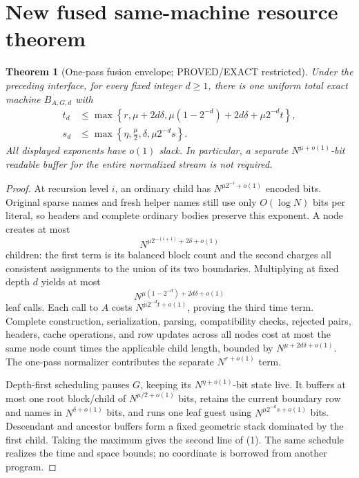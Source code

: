 \documentclass[11pt]{article}
\newtheorem{theorem}{Theorem}
\begin{document}
\section{New fused same-machine resource theorem}
\begin{theorem}[One-pass fusion envelope; PROVED/EXACT restricted]
Under the preceding interface, for every fixed integer \(d\ge1\), there is
one uniform total exact machine \(B_{A,G,d}\) with
\[
\boxed{\begin{aligned}
t_d&\le\max\left\{r,
 \mu+2d\delta,
 \mu(1-2^{-d})+2d\delta+\mu 2^{-d}t\right\},\\
s_d&\le\max\left\{\eta,
 \frac\mu2,\delta,\mu 2^{-d}s\right\}.
\end{aligned}}
\tag{1}
\]
All displayed exponents have \(o(1)\) slack.  In particular, a separate
\(N^{\mu+o(1)}\)-bit readable buffer for the entire normalized stream is not
required.
\end{theorem}
\begin{proof}
At recursion level \(i\), an ordinary child has
\(N^{\mu 2^{-i}+o(1)}\) encoded bits.  Original sparse names and fresh helper
names still use only \(O(\log N)\) bits per literal, so headers and complete
ordinary bodies preserve this exponent.  A node creates at most
\[
N^{\mu2^{-(i+1)}+2\delta+o(1)}
\]
children: the first term is its balanced block count and the second charges
all consistent assignments to the union of its two boundaries.  Multiplying
at fixed depth \(d\) yields at most
\[
N^{\mu(1-2^{-d})+2d\delta+o(1)}
\]
leaf calls.  Each call to \(A\) costs
\(N^{\mu 2^{-d}t+o(1)}\), proving the third time term.  Complete construction,
serialization, parsing, compatibility checks, rejected pairs, headers,
cache operations, and row updates across all nodes cost at most the same
node count times the applicable child length, bounded by
\(N^{\mu+2d\delta+o(1)}\).  The one-pass normalizer contributes the separate
\(N^{r+o(1)}\) term.

Depth-first scheduling pauses \(G\), keeping its
\(N^{\eta+o(1)}\)-bit state live.  It buffers at most one root block/child of
\(N^{\mu/2+o(1)}\) bits, retains the current boundary row and names in
\(N^{\delta+o(1)}\) bits, and runs one leaf guest using
\(N^{\mu 2^{-d}s+o(1)}\) bits.  Descendant and ancestor buffers form a fixed
geometric stack dominated by the first child.  Taking the maximum gives the
second line of (1).  The same schedule realizes the time and space bounds;
no coordinate is borrowed from another program.
\end{proof}
\end{document}
